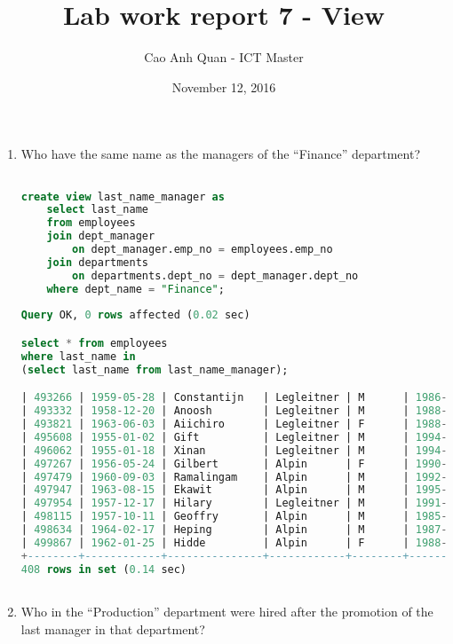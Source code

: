 \documentclass[12pt]{article}
\title{Lab work report 7 - View}
\author{Cao Anh Quan - ICT Master}
\date{November 12, 2016}
\begin{document}
 
\begin{titlepage}
\maketitle
\end{titlepage}

\begin{enumerate}



\item Who have the same name as the managers of the “Finance” department?
\begin{lstlisting}[language=SQL]

create view last_name_manager as 
	select last_name
	from employees 
	join dept_manager
		on dept_manager.emp_no = employees.emp_no
	join departments 
		on departments.dept_no = dept_manager.dept_no
	where dept_name = "Finance";
	
Query OK, 0 rows affected (0.02 sec)

select * from employees 
where last_name in 
(select last_name from last_name_manager);

| 493266 | 1959-05-28 | Constantijn   | Legleitner | M      | 1986-05-25 |
| 493332 | 1958-12-20 | Anoosh        | Legleitner | M      | 1988-11-10 |
| 493821 | 1963-06-03 | Aiichiro      | Legleitner | F      | 1988-04-07 |
| 495608 | 1955-01-02 | Gift          | Legleitner | M      | 1994-04-28 |
| 496062 | 1955-01-18 | Xinan         | Legleitner | M      | 1994-05-02 |
| 497267 | 1956-05-24 | Gilbert       | Alpin      | F      | 1990-07-21 |
| 497479 | 1960-09-03 | Ramalingam    | Alpin      | M      | 1992-05-03 |
| 497947 | 1963-08-15 | Ekawit        | Alpin      | M      | 1995-06-29 |
| 497954 | 1957-12-17 | Hilary        | Legleitner | M      | 1991-08-07 |
| 498115 | 1957-10-11 | Geoffry       | Alpin      | M      | 1985-10-01 |
| 498634 | 1964-02-17 | Heping        | Alpin      | M      | 1987-12-14 |
| 499867 | 1962-01-25 | Hidde         | Alpin      | F      | 1988-10-13 |
+--------+------------+---------------+------------+--------+------------+
408 rows in set (0.14 sec)



\end{lstlisting}

\item Who in the “Production” department were hired after the promotion of the last
 manager in that department?
 \begin{lstlisting}[language=SQL]


\end{lstlisting}
\end{enumerate}
\end{document}
